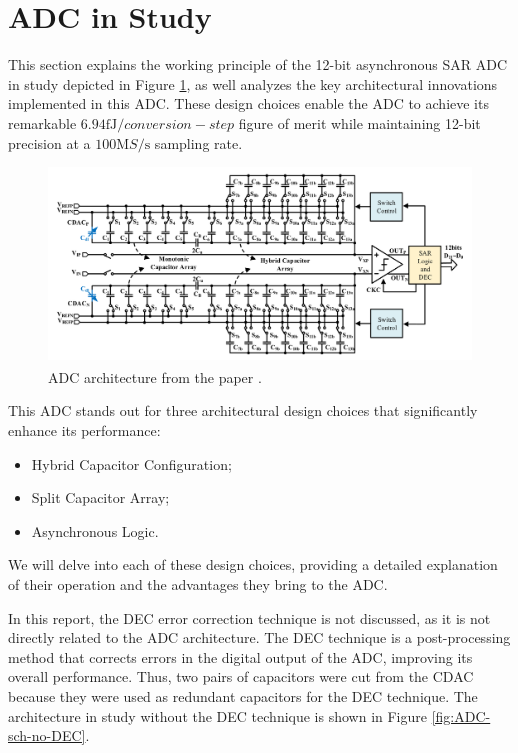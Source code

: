 \section{ADC in Study}
\label{sec:adc_in_study}

This section explains the working principle of the 12-bit asynchronous SAR ADC in study depicted in Figure \ref{fig:ADC-arch-paper}, as well analyzes the key architectural innovations implemented in this ADC. These design choices enable the ADC to achieve its remarkable $6.94 \si{\femto \joule}/conversion-step$ figure of merit while maintaining 12-bit precision at a $100 \si{\mega S \per \second}$ sampling rate.

\begin{figure}[H]
    \centering
    \includegraphics[width=1\textwidth]{Images/ADC-arch-paper.png}
    \caption{ADC architecture from the paper \textsuperscript{\cite{paper}}.}
    \label{fig:ADC-arch-paper}
\end{figure}

This ADC stands out for three architectural design choices that significantly enhance its performance:
\begin{itemize}
    \item Hybrid Capacitor Configuration;
    
    \item Split Capacitor Array;
    
    \item Asynchronous Logic.
\end{itemize}

We will delve into each of these design choices, providing a detailed explanation of their operation and the advantages they bring to the ADC.

In this report, the DEC error correction technique is not discussed, as it is not directly related to the ADC architecture. The DEC technique is a post-processing method that corrects errors in the digital output of the ADC, improving its overall performance. Thus, two pairs of capacitors were cut from the CDAC because they were used as redundant capacitors for the DEC technique. The architecture in study without the DEC technique is shown in Figure \ref{fig:ADC-sch-no-DEC}.

